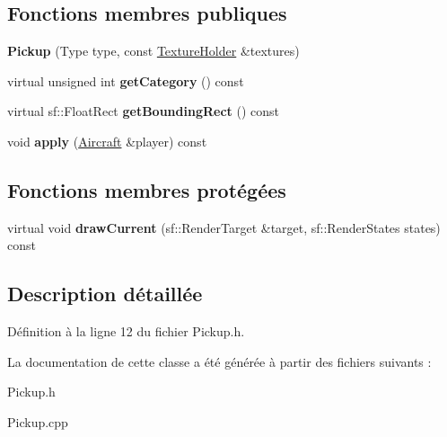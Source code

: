 \subsection*{Fonctions membres publiques}
\begin{DoxyCompactItemize}
\item 
\hypertarget{class_pickup_ae8c1d17163c2c737c861db3850a2ad68}{}\label{class_pickup_ae8c1d17163c2c737c861db3850a2ad68} 
{\bfseries Pickup} (Type type, const \hyperlink{class_resource_holder}{Texture\+Holder} \&textures)
\item 
\hypertarget{class_pickup_ab39f5df989d7aa1e6ce61fe919bb7b70}{}\label{class_pickup_ab39f5df989d7aa1e6ce61fe919bb7b70} 
virtual unsigned int {\bfseries get\+Category} () const
\item 
\hypertarget{class_pickup_a3d824cae9f01d5fbf61667fa66030cb2}{}\label{class_pickup_a3d824cae9f01d5fbf61667fa66030cb2} 
virtual sf\+::\+Float\+Rect {\bfseries get\+Bounding\+Rect} () const
\item 
\hypertarget{class_pickup_ac6fa914202ecb53ee2bce699c80fe4d7}{}\label{class_pickup_ac6fa914202ecb53ee2bce699c80fe4d7} 
void {\bfseries apply} (\hyperlink{class_aircraft}{Aircraft} \&player) const
\end{DoxyCompactItemize}
\subsection*{Fonctions membres protégées}
\begin{DoxyCompactItemize}
\item 
\hypertarget{class_pickup_a947ce2fe192803e6730942a5ae9794ff}{}\label{class_pickup_a947ce2fe192803e6730942a5ae9794ff} 
virtual void {\bfseries draw\+Current} (sf\+::\+Render\+Target \&target, sf\+::\+Render\+States states) const
\end{DoxyCompactItemize}


\subsection{Description détaillée}


Définition à la ligne 12 du fichier Pickup.\+h.



La documentation de cette classe a été générée à partir des fichiers suivants \+:\begin{DoxyCompactItemize}
\item 
Pickup.\+h\item 
Pickup.\+cpp\end{DoxyCompactItemize}
